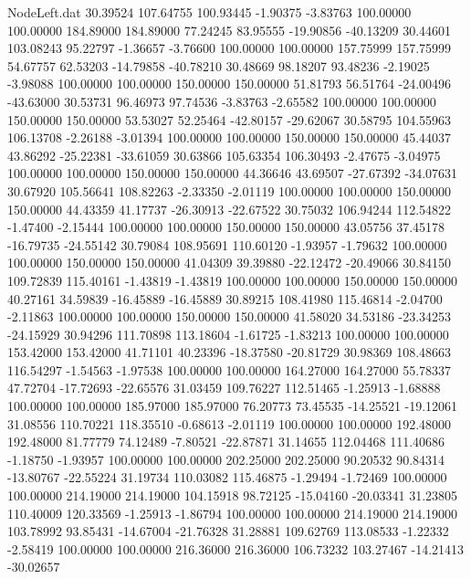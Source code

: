 \begin{filecontents}{NodeLeft.dat}
  30.39524  107.64755  100.93445    -1.90375   -3.83763  100.00000  100.00000  184.89000  184.89000   77.24245   83.95555  -19.90856  -40.13209
  30.44601  103.08243   95.22797    -1.36657   -3.76600  100.00000  100.00000  157.75999  157.75999   54.67757   62.53203  -14.79858  -40.78210
  30.48669   98.18207   93.48236    -2.19025   -3.98088  100.00000  100.00000  150.00000  150.00000   51.81793   56.51764  -24.00496  -43.63000
  30.53731   96.46973   97.74536    -3.83763   -2.65582  100.00000  100.00000  150.00000  150.00000   53.53027   52.25464  -42.80157  -29.62067
  30.58795  104.55963  106.13708    -2.26188   -3.01394  100.00000  100.00000  150.00000  150.00000   45.44037   43.86292  -25.22381  -33.61059
  30.63866  105.63354  106.30493    -2.47675   -3.04975  100.00000  100.00000  150.00000  150.00000   44.36646   43.69507  -27.67392  -34.07631
  30.67920  105.56641  108.82263    -2.33350   -2.01119  100.00000  100.00000  150.00000  150.00000   44.43359   41.17737  -26.30913  -22.67522
  30.75032  106.94244  112.54822    -1.47400   -2.15444  100.00000  100.00000  150.00000  150.00000   43.05756   37.45178  -16.79735  -24.55142
  30.79084  108.95691  110.60120    -1.93957   -1.79632  100.00000  100.00000  150.00000  150.00000   41.04309   39.39880  -22.12472  -20.49066
  30.84150  109.72839  115.40161    -1.43819   -1.43819  100.00000  100.00000  150.00000  150.00000   40.27161   34.59839  -16.45889  -16.45889
  30.89215  108.41980  115.46814    -2.04700   -2.11863  100.00000  100.00000  150.00000  150.00000   41.58020   34.53186  -23.34253  -24.15929
  30.94296  111.70898  113.18604    -1.61725   -1.83213  100.00000  100.00000  153.42000  153.42000   41.71101   40.23396  -18.37580  -20.81729
  30.98369  108.48663  116.54297    -1.54563   -1.97538  100.00000  100.00000  164.27000  164.27000   55.78337   47.72704  -17.72693  -22.65576
  31.03459  109.76227  112.51465    -1.25913   -1.68888  100.00000  100.00000  185.97000  185.97000   76.20773   73.45535  -14.25521  -19.12061
  31.08556  110.70221  118.35510    -0.68613   -2.01119  100.00000  100.00000  192.48000  192.48000   81.77779   74.12489   -7.80521  -22.87871
  31.14655  112.04468  111.40686    -1.18750   -1.93957  100.00000  100.00000  202.25000  202.25000   90.20532   90.84314  -13.80767  -22.55224
  31.19734  110.03082  115.46875    -1.29494   -1.72469  100.00000  100.00000  214.19000  214.19000  104.15918   98.72125  -15.04160  -20.03341
  31.23805  110.40009  120.33569    -1.25913   -1.86794  100.00000  100.00000  214.19000  214.19000  103.78992   93.85431  -14.67004  -21.76328
  31.28881  109.62769  113.08533    -1.22332   -2.58419  100.00000  100.00000  216.36000  216.36000  106.73232  103.27467  -14.21413  -30.02657

\end{filecontents}
